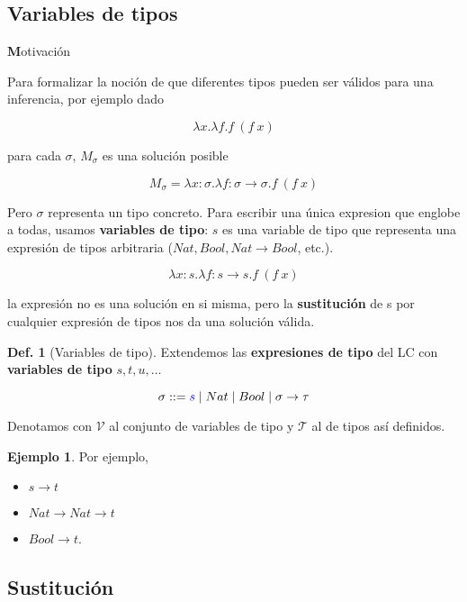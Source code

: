 \documentclass{report}
\theoremstyle{definition} %
\newtheorem{definition}{Def.}[chapter]
\newtheorem*{example*}{Ejemplo}
\newenvironment{nota}[1]
    {\begin{leftbar}\textbf{#1}}
    {\end{leftbar}}
\newcommand{\tfunc}[2]{#1 \to #2}
\newcommand{\abs}[3]{\lambda #1 : #2 . #3}
\newcommand{\app}[2]{#1 \ #2} %
\newcommand{\uabs}[2]{\lambda #1 . #2} %
\newcommand{\select}[1]{\textcolor{blue}{#1}}
\newcommand{\typeVars}{\mathcal{V}}
\newcommand{\types}{\mathcal{T}}
\begin{document}
\subsection{Variables de tipos}


\begin{nota} Motivación

Para formalizar la noción de que diferentes tipos pueden ser válidos para una
inferencia, por ejemplo dado

\[
    \uabs{x}{\uabs{f}{\app{f}{(\app{f}{x})}}}
\]


para cada $\sigma$, $M_\sigma$ es una solución posible

\[
    M_\sigma = \abs{x}{\sigma}{\abs{f}{\tfunc{\sigma}{\sigma}}{\app{f}{(\app{f}{x})}}}
\]

Pero $\sigma$ representa un tipo concreto. Para escribir una única expresion que
englobe a todas, usamos \textbf{variables de tipo}: $s$ es una variable de tipo
que representa una expresión de tipos arbitraria ($Nat, Bool,
\tfunc{Nat}{Bool}$, etc.).

\[
    \abs{x}{s}{\abs{f}{\tfunc{s}{s}}{\app{f}{(\app{f}{x})}}}
\]

la expresión no es una solución en si misma, pero la \textbf{sustitución} de s
por cualquier expresión de tipos nos da una solución válida.

\end{nota}


\begin{definition}[Variables de tipo]
    Extendemos las \textbf{expresiones de tipo} del LC con \textbf{variables de
    tipo} $s, t, u, \dots$
    
    \[
        \sigma ::= \select{s} \mid Nat \mid Bool \mid \tfunc{\sigma}{\tau}
    \]

    Denotamos con $\typeVars$ al conjunto de variables de tipo y $\types$
    al de tipos así definidos.

    \begin{example*} Por ejemplo,
        \begin{itemize}
            \item $\tfunc{s}{t}$
            \item $\tfunc{Nat}{\tfunc{Nat}{t}}$
            \item $\tfunc{Bool}{t}$.
        \end{itemize}
    \end{example*}
\end{definition}

\subsection{Sustitución}
\end{document}
